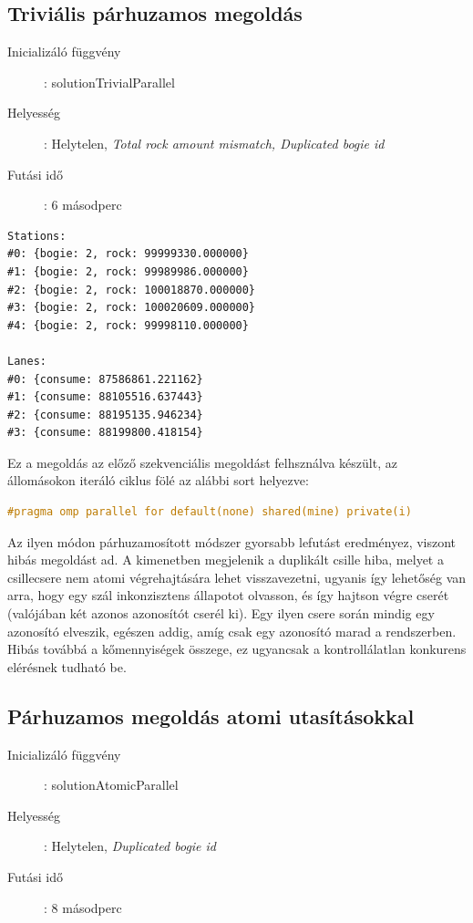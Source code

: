 \documentclass[a4paper,10pt]{article}
\begin{document}
    \subsection{Triviális párhuzamos megoldás}
\begin{description}
  \item[Inicializáló függvény]: solutionTrivialParallel
  \item[Helyesség]: Helytelen, \emph{Total rock amount mismatch, Duplicated bogie id}
  \item[Futási idő]: 6 másodperc
\end{description}

\begin{lstlisting}
Stations:
#0: {bogie: 2, rock: 99999330.000000}
#1: {bogie: 2, rock: 99989986.000000}
#2: {bogie: 2, rock: 100018870.000000}
#3: {bogie: 2, rock: 100020609.000000}
#4: {bogie: 2, rock: 99998110.000000}

Lanes:
#0: {consume: 87586861.221162}
#1: {consume: 88105516.637443}
#2: {consume: 88195135.946234}
#3: {consume: 88199800.418154}
\end{lstlisting}

Ez a megoldás az előző szekvenciális megoldást felhsználva készült, az állomásokon iteráló ciklus fölé az alábbi sort helyezve:

\begin{lstlisting}[language=c]
 #pragma omp parallel for default(none) shared(mine) private(i)
\end{lstlisting}

Az ilyen módon párhuzamosított módszer gyorsabb lefutást eredményez, viszont hibás megoldást ad. A kimenetben megjelenik a duplikált csille hiba, melyet a csillecsere nem atomi végrehajtására lehet visszavezetni, ugyanis így lehetőség van arra, hogy egy szál inkonzisztens állapotot olvasson, és így hajtson végre cserét (valójában két azonos azonosítót cserél ki). Egy ilyen csere során mindig egy azonosító elveszik, egészen addig, amíg csak egy azonosító marad a rendszerben.
Hibás továbbá a kőmennyiségek összege, ez ugyancsak a kontrollálatlan konkurens elérésnek tudható be. 

    \subsection{Párhuzamos megoldás atomi utasításokkal}
\begin{description}
  \item[Inicializáló függvény]: solutionAtomicParallel
  \item[Helyesség]: Helytelen, \emph{Duplicated bogie id}
  \item[Futási idő]: 8 másodperc
\end{description}
\end{document}
